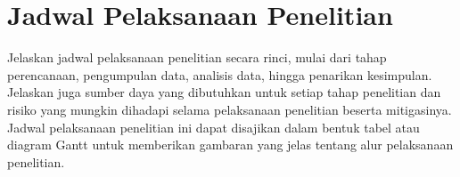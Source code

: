 \section{Jadwal Pelaksanaan Penelitian}
Jelaskan jadwal pelaksanaan penelitian secara rinci, mulai dari tahap perencanaan, pengumpulan data, analisis data, hingga penarikan kesimpulan. Jelaskan juga sumber daya yang dibutuhkan untuk setiap tahap penelitian dan risiko yang mungkin dihadapi selama pelaksanaan penelitian beserta mitigasinya. Jadwal pelaksanaan penelitian ini dapat disajikan dalam bentuk tabel atau diagram Gantt untuk memberikan gambaran yang jelas tentang alur pelaksanaan penelitian.  
